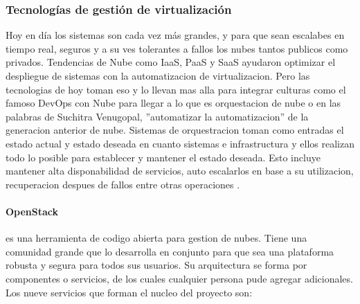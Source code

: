 \subsubsection{Tecnologías de gestión de virtualización}
Hoy en día los sistemas son cada vez más grandes, y para que sean escalabes en tiempo real, seguros y a su ves tolerantes a fallos los nubes tantos publicos como privados. Tendencias de Nube como IaaS, PaaS y SaaS ayudaron optimizar el despliegue de sistemas con la automatizacion de virtualizacion. Pero las tecnologias de hoy toman eso y lo llevan mas alla para integrar culturas como el famoso DevOps con Nube para llegar a lo que es orquestacion de nube o en las palabras de Suchitra Venugopal, ''automatizar la automatizacion'' de la generacion anterior de nube. Sistemas de orquestracion toman como entradas el estado actual y estado deseada en cuanto sistemas e infrastructura y ellos realizan todo lo posible para establecer y mantener el estado deseada. Esto incluye mantener alta disponabilidad de servicios, auto escalarlos en base a su utilizacion, recuperacion despues de fallos entre otras operaciones \citep{IBM-Cloud-Orchestration}.

\paragraph{OpenStack}
es una herramienta de codigo abierta para gestion de nubes. Tiene una comunidad grande que lo desarrolla en conjunto para que sea una plataforma robusta y segura para todos sus usuarios. Su arquitectura se forma por componentes o servicios, de los cuales cualquier persona pude agregar adicionales. Los nueve servicios que forman el nucleo del proyecto son:

